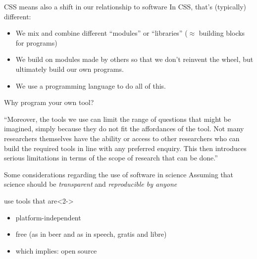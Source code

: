 \begin{frame}{CSS means also a shift in our relationship to software}
	In CSS, that's (typically) different:
	\begin{itemize}
		\item We mix and combine different ``modules'' or ``libraries'' ($\approx$ building blocks for programs)
		\item We build on modules made by others so that we don't reinvent the wheel, but ultimately build our own programs.
		\item We use a programming language to do all of this.
	\end{itemize}
\end{frame}






\begin{frame}{Why program your own tool?}
	\begin{block}{\textcite{Vis2013}}
		``Moreover, the tools we use can limit the range of questions that might be imagined, simply because they do not fit the affordances of the tool. Not many researchers themselves have the ability or access to other researchers who can build the required tools in line with any preferred enquiry. This then introduces serious limitations in terms of the scope of research that can be done.''	
	\end{block}
	
\end{frame}


\begin{frame}{Some considerations regarding the use of software in science}
	Assuming that science should be \emph{transparent} and \emph{reproducible by anyone}\onslide<2->{, we should}
	\begin{block}{use tools that are}<2->
		\begin{itemize}
			\item platform-independent 
			\item free (as in beer and as in speech, gratis and libre)
			\item which implies: open source
		\end{itemize}
	\end{block}
\end{frame}

